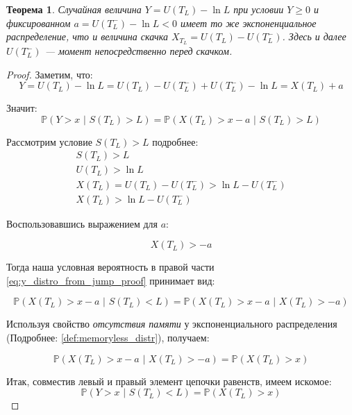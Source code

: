\documentclass[a4paper,12pt]{article}
\newtheorem{theorem}{Теорема}
\theoremstyle{definition}
\begin{document}
\begin{theorem}\label{thm:jump_distribution_is_same}
Случайная величина $Y=U(T_L) - \ln L$ при условии $Y \ge 0$ и фиксированном $a = U(T_L^{-}) - \ln L < 0$ имеет то же экспоненциальное распределение, что и величина скачка $X_{T_L}=U(T_L) - U(T_L^{-})$. Здесь и далее $U(T_L^{-})$ --- момент непосредственно перед скачком.
\end{theorem}
\begin{proof}
Заметим, что:
\begin{equation*}
    Y = U(T_L) - \ln L = U(T_L) - U(T_L^{-}) + U(T_L^{-}) - \ln L = X(T_L) + a
\end{equation*}

Значит:
\begin{equation}\label{eq:y_distro_from_jump_proof}
    \mathbb{P}(Y > x \text{ | } S(T_L) > L) = \mathbb{P}(X(T_L) > x - a \text{ | } S(T_L) > L)
\end{equation}

Рассмотрим условие $S(T_L) > L$ подробнее:
\begin{gather*}
    S(T_L) > L \\
    U(T_L) > \ln L \\
    X(T_L) = U(T_L) - U(T_L^{-}) > \ln L - U(T_L^{-}) \\
    X(T_L) > \ln L - U(T_L^{-})
\end{gather*}

Воспользовавшись выражением для $a$:

\begin{equation*}
    X(T_L) > -a
\end{equation*}

Тогда наша условная вероятность в правой части \eqref{eq:y_distro_from_jump_proof} принимает вид:

\begin{equation*}
    \mathbb{P}(X(T_L) > x - a \text{ | } S(T_L) < L) = \mathbb{P}(X(T_L) > x - a \text{ | } X(T_L) > -a)
\end{equation*}

Используя свойство \textit{отсутствия памяти} у экспоненциального распределения (Подробнее: \ref{def:memoryless_distr}), получаем:

\begin{equation*}
    \mathbb{P}(X(T_L) > x - a \text{ | } X(T_L) > -a) = \mathbb{P}(X(T_L) > x)
\end{equation*}

Итак, совместив левый и правый элемент цепочки равенств, имеем искомое:
\begin{equation}\label{eq:y_distro_from_jump}
    \mathbb{P}(Y > x \text{ | } S(T_L) < L) = \mathbb{P}(X(T_L) > x)
\end{equation}

\end{proof}
\end{document}
